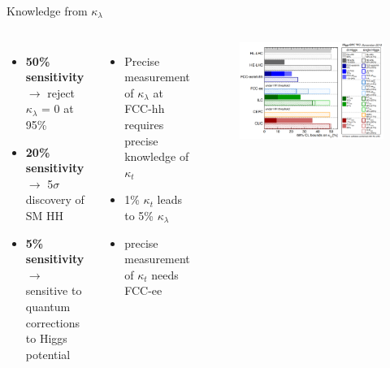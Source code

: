 \begin{frame}{Knowledge from $\kappa_{\lambda}$}
\begin{columns}
\begin{itemize}
    \item \textbf{50\% sensitivity} $\to$ reject $\kappa_{\lambda}$ = 0 at 95\%
    \item \textbf{20\% sensitivity} $\to$ 5$\sigma$ discovery of SM HH
    \item \textbf{5\% sensitivity} $\to$ sensitive to quantum corrections to Higgs potential
\end{itemize}

\begin{itemize}
    \item Precise measurement of $\kappa_{\lambda}$ at FCC-hh requires precise knowledge of $\kappa_{t}$ 
    \item 1\% $\kappa_{t}$ leads to 5\% $\kappa_{\lambda}$
    \item precise measurement of $\kappa_{t}$ needs FCC-ee
\end{itemize}

\begin{figure}
    \centering
    \includegraphics[width=1.\textwidth]{BackUp/Part4/Img/kl_future_C.png}
\end{figure}
\end{columns}
\end{frame}